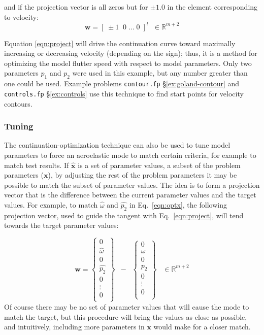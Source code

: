 \documentclass[11pt,openany,twoside]{book}
\numberwithin{equation}{section}		%
\newcommand{\Code}[1]{{\small\tt #1}}
\newcommand{\Vector}[1]{\boldsymbol{#1}}
\newcommand{\Sectref}[1]{\S\ref{#1}}
\newcommand{\Eqn}[1]{Eq.\ \ref{#1}}  %
\begin{document}
and if the projection vector
is all zeros but for $\pm1.0$ in the element corresponding to velocity:
\begin{equation}
\label{eqn:p1p2w}
\Vector{w} = \left[\;\pm1 \;\; 0 \; \dots \; 0 \;\right]^t \;\; \in \mathbb{R}^{m+2}
\end{equation}

Equation \ref{eqn:project} will drive the continuation curve toward
maximally increasing or decreasing velocity (depending on the sign);
thus, it is a method for optimizing the model
flutter speed with respect to model parameters.
Only two parameters $p_1$ and $p_2$
were used in this example, but any number greater than one could be used.
Example problems \Code{contour.fp} \Sectref{ex:goland-contour} and \Code{controls.fp}
\Sectref{ex:controls} use this technique to find start points for
velocity contours.

\subsubsection{Tuning}
The continuation-optimization technique can also be used to tune model parameters to
force an aeroelastic mode to match certain criteria,
for example to match test results.
If $\hat{\Vector{x}}$ is a set of
parameter values, a subset of the problem parameters ($\Vector{x}$),
by adjusting the rest of the problem parameters it may be possible
to match the subset of parameter values.
The idea is to form a projection vector that is the difference between
the current parameter values and the target values.
For example, to match
$\hat{\omega}$ and $\hat{p_2}$ in \Eqn{eqn:optx}, the following
projection vector, used to guide the tangent with \Eqn{eqn:project},
will tend towards the target parameter values:

\begin{equation}
\Vector{w} = \left\{\begin{array}{c}
0 \\
\hat{\omega} \\
0 \\
\hat{p_2} \\
0 \\
\vdots \\
0 \\
\end{array} \right\} \;\; - \;\;
\left\{\begin{array}{c}
0 \\
\omega \\
0 \\
p_2 \\
0 \\
\vdots \\
0 \\
\end{array} \right\}
\;\;\; \in \mathbb{R}^{m+2}
\end{equation}
Of course there may be no set of parameter values that will cause
the mode to match the target, but this procedure will bring the
values as close as possible, and intuitively, including more parameters
in $\Vector{x}$ would make for a closer match.
\end{document}
